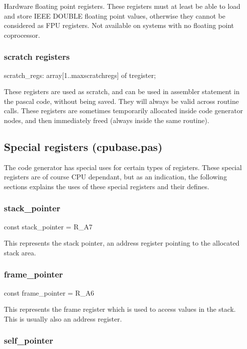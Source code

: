 \documentclass [a4paper,12pt]{article}
\begin{document}
Hardware floating point registers. These registers must at least be able to
load and store IEEE DOUBLE floating point values, otherwise they cannot be
considered as FPU registers. Not available on systems with no floating point
coprocessor.

\subsubsection{scratch registers}
\label{subsubsec:scratch}

\textsf{scratch{\_}regs: array[1..maxscratchregs] of tregister;}

These registers are used as scratch, and can be used in assembler statement
in the pascal code, without being saved. They will always be valid across
routine calls. These registers are sometimes temporarily allocated inside
code generator nodes, and then immediately freed (always inside the same
routine).

\subsection{Special registers (cpubase.pas)}
\label{subsec:special}

The code generator has special uses for certain types of registers. These
special registers are of course CPU dependant, but as an indication, the
following sections explains the uses of these special registers and their
defines.

\subsubsection{stack{\_}pointer}
\label{subsubsec:stack}

\textsf{const stack{\_}pointer = R{\_}A7}

This represents the stack pointer, an address register pointing to the
allocated stack area.

\subsubsection{frame{\_}pointer}
\label{subsubsec:frame}

\textsf{const frame{\_}pointer = R{\_}A6}

This represents the frame register which is used to access values in the
stack. This is usually also an address register.

\subsubsection{self{\_}pointer}
\label{subsubsec:mylabel26}
\end{document}
